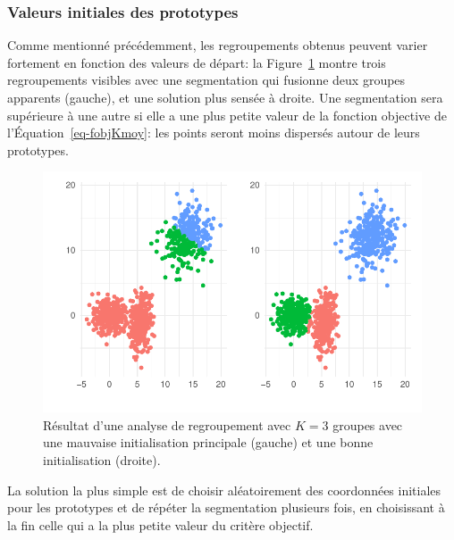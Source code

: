 \documentclass[
  11pt,
  letterpaper,
]{scrbook}
\theoremstyle{definition}
\theoremstyle{remark}
\begin{document}
\hypertarget{valeurs-initiales-des-prototypes}{%
\subsubsection*{Valeurs initiales des
prototypes}\label{valeurs-initiales-des-prototypes}}

Comme mentionné précédemment, les regroupements obtenus peuvent varier
fortement en fonction des valeurs de départ: la
Figure~\ref{fig-kmoyenne-mauvais} montre trois regroupements visibles
avec une segmentation qui fusionne deux groupes apparents (gauche), et
une solution plus sensée à droite. Une segmentation sera supérieure à
une autre si elle a une plus petite valeur de la fonction objective de
l'Équation~\ref{eq-fobjKmoy}: les points seront moins dispersés autour
de leurs prototypes.

\begin{figure}[ht!]

{\centering \includegraphics{./03-regroupements_files/figure-pdf/fig-kmoyenne-mauvais-1.pdf}

}

\caption{\label{fig-kmoyenne-mauvais}Résultat d'une analyse de
regroupement avec \(K=3\) groupes avec une mauvaise initialisation
principale (gauche) et une bonne initialisation (droite).}

\end{figure}

La solution la plus simple est de choisir aléatoirement des coordonnées
initiales pour les prototypes et de répéter la segmentation plusieurs
fois, en choisissant à la fin celle qui a la plus petite valeur du
critère objectif.
\end{document}

